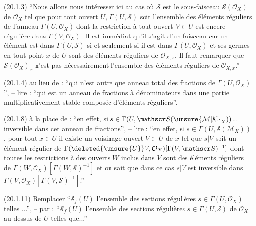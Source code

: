 (20.1.3)  ``Nous allons nous intéresser ici au cas où $\mathscr S$ est le sous-faisceau $\mathscr S(\mathcal O_X)$ de $\mathcal O_X$ tel que pour tout ouvert $U$, $\Gamma(U,\mathscr S)$ soit l'ensemble des éléments réguliers de l'anneau $\Gamma(U,\mathcal O_X)$ dont la restriction à tout ouvert $V\subset U$ est encore régulière dans $\Gamma(V,\mathcal O_X)$. Il est immédiat qu'il s'agit d'un faisceau car un élément est dans $\Gamma(U,\mathscr S)$ si et seulement si il est dans $\Gamma(U,\mathcal O_X)$ et  ses germes en tout point $x$ de $U$ sont des éléments réguliers de $\mathcal O_{X,x}$. Il faut remarquer que $\mathscr S(\mathcal O_X)_x$ n'est pas  nécessairement l'ensemble des éléments réguliers de $\mathcal O_{X,x}$.''

(20.1.4) au lieu de : ``qui n'est autre que anneau total des fractions de $\Gamma(U,\mathcal O_X)$'', -- lire : ``qui est un anneau de fractions à dénominateurs dans une partie multiplicativement stable composée d'éléments réguliers''.

(20.1.8) à la place de : ``en effet, si $s\in\Gamma(U,\mathscr S(\unsure{\mathcal M|\mathcal K}_X))$... inversible dans cet anneau de fractions'', -- lire : ``en effet, si $s\in\Gamma(U,\mathscr S(\mathcal M_X))$, pour tout $x\in U$ il existe un voisinage ouvert $V\subset U$ de $x$ tel que $s|V$ soit un élément régulier de $\Gamma(\deleted{\unsure{U}}V,\mathcal O_X)[\Gamma(V,\mathscr S)^{-1}]$ dont toutes les restrictions à des ouverts $W$ inclus dans $V$ sont des éléments réguliers de $\Gamma(W,\mathcal O_X)[\Gamma(W,\mathscr S)^{-1}]$ et on sait que dans ce cas $s|V$ est inversible dans $\Gamma(V,\mathcal O_X)[\Gamma(V,\mathscr S)^{-1}]$.''

(20.1.11) Remplacer ``$\mathscr S_f(U)$ l'ensemble des sections régulières $s\in\Gamma(U,\mathcal O_X)$ telles ...'', -- par : ``$\mathscr S_f(U)$ l'ensemble des sections régulières $s\in\Gamma(U,\mathscr S)$  de $\mathcal O_X$ au dessus de $U$ telles que...''


